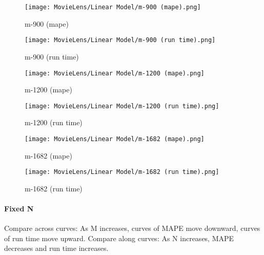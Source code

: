 \documentclass[12pt]{article}
\begin{document}
\begin{figure}[H]
\centering
    \begin{minipage}{0.45\textwidth}
        \centering
        \texttt{[image: MovieLens/Linear Model/m-900 (mape).png]}
        \caption{m-900 (mape)}
        
    \end{minipage}\hfill
    \begin{minipage}{0.45\textwidth}
        \centering
        \texttt{[image: MovieLens/Linear Model/m-900 (run time).png]}
        \caption{m-900 (run time)}
    \end{minipage}
\end{figure}

\begin{figure}[H]
\centering
    \begin{minipage}{0.45\textwidth}
        \centering
        \texttt{[image: MovieLens/Linear Model/m-1200 (mape).png]}
        \caption{m-1200 (mape)}
        
    \end{minipage}\hfill
    \begin{minipage}{0.45\textwidth}
        \centering
        \texttt{[image: MovieLens/Linear Model/m-1200 (run time).png]}
        \caption{m-1200 (run time)}
    \end{minipage}
\end{figure}

\begin{figure}[H]
\centering
    \begin{minipage}{0.45\textwidth}
        \centering
        \texttt{[image: MovieLens/Linear Model/m-1682 (mape).png]}
        \caption{m-1682 (mape)}
        
    \end{minipage}\hfill
    \begin{minipage}{0.45\textwidth}
        \centering
        \texttt{[image: MovieLens/Linear Model/m-1682 (run time).png]}
        \caption{m-1682 (run time)}
    \end{minipage}
\end{figure}

\paragraph{Fixed N}
Compare across curves:\newline
As M increases, curves of MAPE move downward, curves of run time move upward.
\newline
Compare along curves:\newline
As N increases, MAPE decreases and run time increases. 
\end{document}
